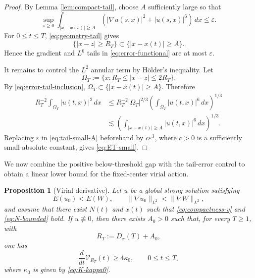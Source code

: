 \documentclass[10pt,a4paper]{amsart}
\numberwithin{equation}{section}
\newtheorem{proposition}[theorem]{Proposition}
\newcommand{\eps}{\varepsilon}
\newcommand{\Vc}{\mathcal V}
\begin{document}
\begin{proof}
By Lemma \ref{lem:compact-tail}, choose $A$ sufficiently large so that
\begin{equation}\label{eq:tail-small-A}
  \sup_{s\ge0}\int_{|x-x(s)|\ge A}
  (|\nabla u(s,x)|^2+|u(s,x)|^6)\,dx\le\eps.
\end{equation}
For $0\le t\le T$, \eqref{eq:geometry-tail} gives
\begin{equation}\label{eq:error-tail-inclusion}
  \{|x-z|\ge R_T\}\subset\{|x-x(t)|\ge A\}.
\end{equation}
Hence the gradient and $L^6$ tails in \eqref{eq:error-functional} are at most $\eps$.

It remains to control the $L^2$ annular term by H\"older's inequality. Let
\begin{equation*}
  \Omega_T:=\{x:R_T\le|x-z|\le2R_T\}.
\end{equation*}
By \eqref{eq:error-tail-inclusion}, $\Omega_T\subset\{|x-x(t)|\ge A\}$. Therefore
\begin{align*}
  R_T^{-2}\int_{\Omega_T}|u(t,x)|^2\,dx
  &\le R_T^{-2}|\Omega_T|^{2/3}
  \left(\int_{\Omega_T}|u(t,x)|^6\,dx\right)^{1/3}\\
  &\lesssim
  \left(\int_{|x-x(t)|\ge A}|u(t,x)|^6\,dx\right)^{1/3}.
\end{align*}
Replacing $\eps$ in \eqref{eq:tail-small-A} beforehand by $c\eps^3$, where $c>0$ is a sufficiently small absolute constant, gives \eqref{eq:ET-small}.
\end{proof}

We now combine the positive below-threshold gap with the tail-error control to obtain a linear lower bound for the fixed-center virial action.

\begin{proposition}[Virial derivative]\label{prop:virial-derivative-lower}
Let $u$ be a global strong solution satisfying
\begin{equation*}
  E(u_0)<E(W),
  \qquad \|\nabla u_0\|_{L^2}<\|\nabla W\|_{L^2},
\end{equation*}
and assume that there exist $N(t)$ and $x(t)$ such that \eqref{eq:compactness-v} and \eqref{eq:N-bounded} hold. If $u\not\equiv0$, then there exists $A_0>0$ such that, for every $T\ge1$, with
\begin{equation*}
  R_T:=D_x(T)+A_0,
\end{equation*}
one has
\begin{equation*}
  \frac{d}{dt}\Vc_{R_T}(t)\ge4\kappa_0,
  \qquad 0\le t\le T,
\end{equation*}
where $\kappa_0$ is given by \eqref{eq:K-kappa0}.
\end{proposition}
\end{document}
